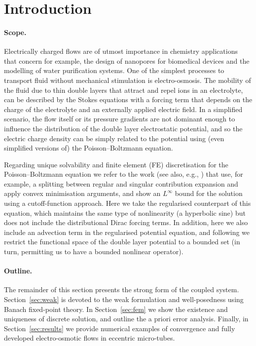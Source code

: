 
\section{Introduction}
\paragraph{Scope.} Electrically charged flows are of utmost importance in %
chemistry applications that concern for example, the design of nanopores for biomedical devices and the modelling of water purification systems. One of the simplest processes to transport fluid without mechanical stimulation is electro-osmosis. The mobility of the fluid due to thin double layers that attract and repel ions in an electrolyte, can be described by the Stokes equations  with a forcing term that depends on the charge of the electrolyte and an externally applied electric field. In a simplified scenario, the flow itself or its pressure gradients are not dominant enough to influence the distribution of the double layer electrostatic potential, and so the electric charge density can be simply related to the potential using (even simplified versions of) the Poisson--Boltzmann equation. 

Regarding unique solvability and finite element (FE) discretisation for the Poisson--Boltzmann equation we refer to the work \cite{chen07} (see also, e.g., \cite{holst12,iglesias22,kraus20}) that use, for example, a splitting between regular and singular contribution expansion and apply convex minimisation arguments, and show an $L^\infty$ bound for the solution using a cutoff-function approach. Here we take the regularised counterpart of this equation, which maintains the same type of  nonlinearity (a hyperbolic sine) but does not include the distributional Dirac forcing terms. In addition, here we  also include an advection term in the regularised potential equation, and following \cite{holst12} we restrict the functional space of the double layer potential to a bounded set (in turn, permitting us to have a bounded nonlinear operator). 

\paragraph{Outline.}  The remainder of this section presents the strong form of the coupled system. Section~\ref{sec:weak} is devoted to the weak formulation and well-posedness  using Banach fixed-point theory. In Section~\ref{sec:fem} we show the existence and uniqueness of discrete solution, and outline the a priori error analysis. Finally, in Section~\ref{sec:results} we provide numerical examples of convergence and fully developed electro-osmotic flows in  eccentric micro-tubes. 

